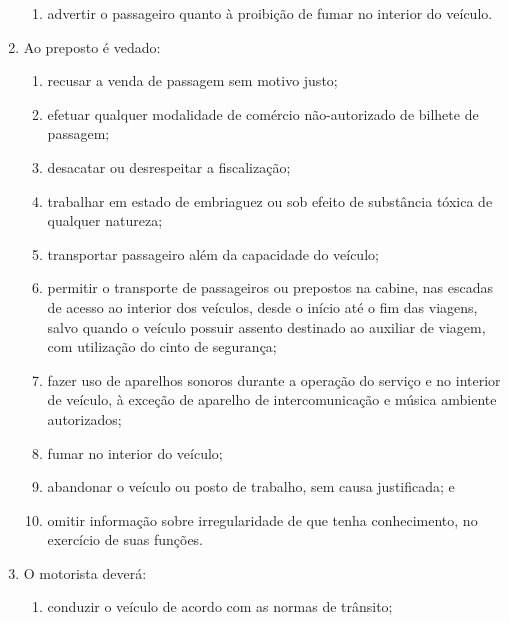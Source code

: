 \begin{enumerate}[resume, label=Art. \arabic*]
\begin{enumerate}[label=\roman*.]
\item advertir o passageiro quanto à proibição de fumar no interior do veículo.

\end{enumerate}

\item Ao preposto é vedado:

\begin{enumerate}[label=\roman*.]

\item recusar a venda de passagem sem motivo justo;

\item efetuar qualquer modalidade de comércio não-autorizado de bilhete de passagem;

\item desacatar ou desrespeitar a fiscalização;

\item trabalhar em estado de embriaguez ou sob efeito de substância tóxica de qualquer natureza;

\item transportar passageiro além da capacidade do veículo;

\item permitir o transporte de passageiros ou prepostos na cabine, nas escadas de acesso ao interior dos veículos, desde o início até o fim das viagens, salvo quando o veículo possuir assento destinado ao auxiliar de viagem, com utilização do cinto de segurança;

\item fazer uso de aparelhos sonoros durante a operação do serviço e no interior de veículo, à exceção de aparelho de intercomunicação e música ambiente autorizados;

\item fumar no interior do veículo;

\item abandonar o veículo ou posto de trabalho, sem causa justificada; e

\item omitir informação sobre irregularidade de que tenha conhecimento, no exercício de suas funções.

\end{enumerate}

\item O motorista deverá:

\begin{enumerate}[label=\roman*.]

\item conduzir o veículo de acordo com as normas de trânsito;


\end{enumerate}
\end{enumerate}
